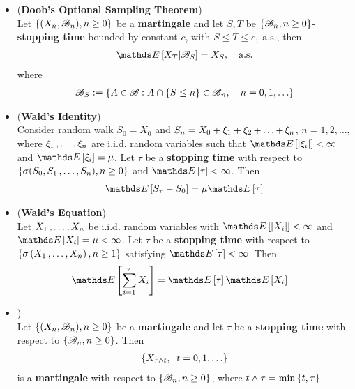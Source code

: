 \documentclass[11pt]{article}
\begin{document}
\begin{itemize}
\item \begin{theorem}(\textbf{Doob's Optional Sampling Theorem}) \citep{billingsley2008probability, resnick2013probability}\\
Let $\left\{(X_n, {\mathscr B}_n), n \ge 0\right\}$ be a \textbf{martingale} and let $S, T$ be $\left\{{\mathscr B}_n, n \ge 0\right\}$-\textbf{stopping time} bounded by constant $c$, with 
$S \le T \le c, \;\text{a.s.}$, then 
\begin{align}
\E{}{X_T | \srB_{S}} = X_S, \quad \text{a.s.} \label{eqn: optional_sampling_theorem}
\end{align} where 
\begin{align*}
{\mathscr B}_{S} := \left\{A \in {\mathscr B}: A\cap \left\{S \le n\right\} \in {\mathscr B}_{n}, \quad n=0,1,\ldots \right\}
\end{align*}
\end{theorem}



\item \begin{theorem}(\textbf{Wald's Identity}) \citep{billingsley2008probability, resnick2013probability}\\
Consider random walk $S_0 = X_0$ and $S_n = X_0 + \xi_1 + \xi_2 \,{+}\ldots{+}\, \xi_n$, $n = 1,2,\ldots$, where $\xi_1 \,{,}\ldots{,}\, \xi_n$ are i.i.d. random variables such that $\E{}{\abs{\xi_i}} < \infty$ and $\E{}{\xi_i} = \mu$. Let $\tau$ be a \textbf{stopping time} with respect to $\left\{\sigma(S_0, S_1 \,{,}\ldots{,}\, S_n), n\ge 0\right\}$ and $\E{}{\tau} < \infty$. Then 
\begin{align*}
\E{}{S_{\tau} - S_0} = \mu \E{}{\tau}
\end{align*}
\end{theorem}

\item \begin{proposition}(\textbf{Wald's Equation}) \citep{billingsley2008probability}\\
Let $X_1 \,{,}\ldots{,}\, X_n$ be i.i.d. random variables with $\E{}{\abs{X_i}} < \infty$ and $\E{}{X_i} = \mu <\infty$. Let $\tau$ be a \textbf{stopping time} with respect to $\left\{\sigma\left(X_1 \,{,}\ldots{,}\, X_n\right), n \ge 1\right\}$ satisfying $\E{}{\tau} < \infty$. Then
\begin{align}
\E{}{\sum_{i=1}^{\tau}X_i} &=\E{}{\tau} \E{}{X_i} \label{eqn: wald_equation}
\end{align}
\end{proposition}

\item \begin{proposition}) \citep{resnick2013probability}\\
Let $\left\{(X_n, {\mathscr B}_n), n \ge 0\right\}$ be a \textbf{martingale} and let $\tau$ be a \textbf{stopping time} with respect to $\left\{{\mathscr B}_n, n \ge 0\right\}$. Then 
\begin{align*}
\left\{X_{\tau \land t}, \;\; t=0, 1, \ldots\right\}
\end{align*} is a \textbf{martingale} with respect to $\left\{{\mathscr B}_n, n \ge 0\right\}$, where $t\land \tau = \min\left\{t, \tau\right\}$.
\end{proposition}
\end{itemize}
\end{document}
